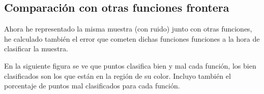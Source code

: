 \documentclass[a4]{article}
\begin{document}
\subsection{Comparación con otras funciones frontera}

Ahora he representado la misma muestra (con ruido) junto con otras funciones,
he calculado también el error que cometen dichas funciones funciones a
la hora de clasificar la muestra.

En la siguiente figura se ve que puntos clasifica bien y mal
cada función, los bien clasificados son los que están en la región de su color.
Incluyo también el porcentaje de puntos mal clasificados para cada función.

\vspace{-3mm}

\begin{figure}[H]
    \centering
    
    

\end{figure}
\end{document}
